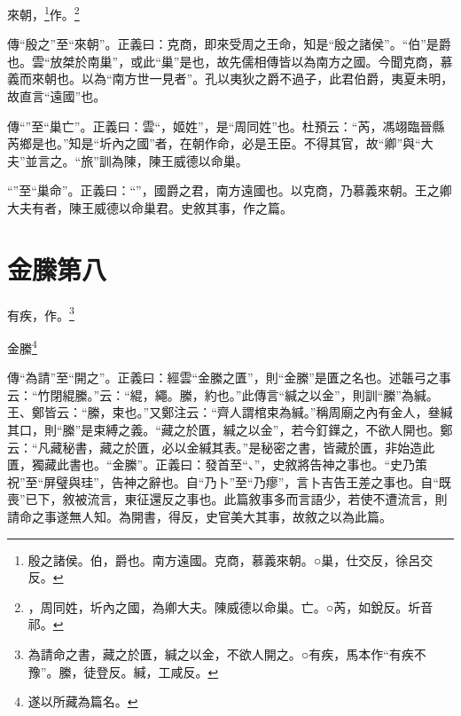 來朝，\footnote{殷之諸侯。伯，爵也。南方遠國。克商，慕義來朝。○巢，仕交反，徐呂交反。}作。\footnote{，周同姓，圻內之國，為卿大夫。陳威德以命巢。亡。○芮，如銳反。圻音祁。}


{\noindent\zhuan{}\fzbyks 傳“殷之”至“來朝”。正義曰：克商，即來受周之王命，知是“殷之諸侯”。“伯”是爵也。雲“放桀於南巢”，或此“巢”是也，故先儒相傳皆以為南方之國。今聞克商，慕義而來朝也。以為“南方世一見者”。孔以夷狄之爵不過子，此君伯爵，夷夏未明，故直言“遠國”也。 \par}

{\noindent\zhuan{}\fzbyks 傳“”至“巢亡”。正義曰：雲“，姬姓”，是“周同姓”也。杜預云：“芮，馮翊臨晉縣芮鄉是也。”知是“圻內之國”者，在朝作命，必是王臣。不得其官，故“卿”與“大夫”並言之。“旅”訓為陳，陳王威德以命巢。 \par}

{\noindent\shu{}\fzkt “”至“巢命”。正義曰：“”，國爵之君，南方遠國也。以克商，乃慕義來朝。王之卿大夫有者，陳王威德以命巢君。史敘其事，作之篇。 \par}

\section{金縢第八}


有疾，作。\footnote{為請命之書，藏之於匱，緘之以金，不欲人開之。○有疾，馬本作“有疾不豫”。縢，徒登反。緘，工咸反。}

金縢\footnote{遂以所藏為篇名。}

{\noindent\zhuan{}\fzbyks 傳“為請”至“開之”。正義曰：經雲“金縢之匱”，則“金縢”是匱之名也。述韔弓之事云：“竹閉緄縢。”云：“緄，繩。縢，約也。”此傳言“緘之以金”，則訓“縢”為緘。王、鄭皆云：“縢，束也。”又鄭注云：“齊人謂棺束為緘。”稱周廟之內有金人，叄緘其口，則“縢”是束縛之義。“藏之於匱，緘之以金”，若今釘鐷之，不欲人開也。鄭云：“凡藏秘書，藏之於匱，必以金緘其表。”是秘密之書，皆藏於匱，非始造此匱，獨藏此書也。“金縢”。正義曰：發首至“、”，史敘將告神之事也。“史乃策祝”至“屏璧與珪”，告神之辭也。自“乃卜”至“乃瘳”，言卜吉告王差之事也。自“既喪”已下，敘被流言，東征還反之事也。此篇敘事多而言語少，若使不遭流言，則請命之事遂無人知。為開書，得反，史官美大其事，故敘之以為此篇。 \par}

